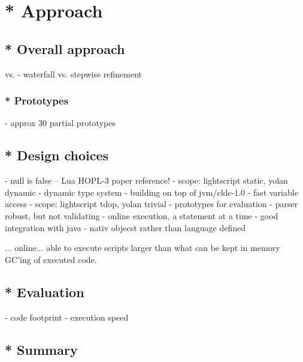 \chapter{* Approach}
\label{method}
\section{* Overall approach}
\cite{waterfall} vs. \cite{stepwise-refinement}
    - waterfall vs. stepwise refinement
\subsection{* Prototypes}
    - approx 30 partial prototypes
\section{* Design choices}
    - null is false -- Lua HOPL-3 paper reference!
    - scope: lightscript static, yolan dynamic
    - dynamic type system
    - building on top of jvm/cldc-1.0
    - fast variable access
    - scope: lightscript tdop, yolan trivial
    - prototypes for evaluation
    - parser robust, but not validating
    - online execution, a statement at a time
    - good integration with java - nativ objecst rather than language defined

... online... able to execute scripts larger than what can be kept in memory
GC'ing of executed code.
\section{* Evaluation}
    - code footprint
    - execution speed
\section{* Summary}
